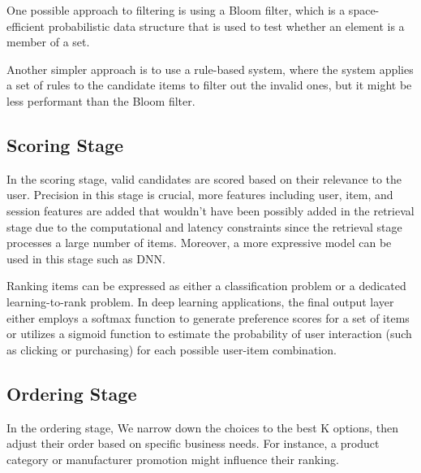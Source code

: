 One possible approach to filtering is using a Bloom filter, which is a space-efficient probabilistic data structure that is used to test whether an element is a member of a set.

Another simpler approach is to use a rule-based system, where the system applies a set of rules to the candidate items to filter out the invalid ones, but it might be less performant than the Bloom filter.


\subsection{Scoring Stage}

In the scoring stage, valid candidates are scored based on their relevance to the user. Precision in this stage is crucial, more features including user, item, and session features are added that wouldn't have been possibly added in the retrieval stage due to the computational and latency constraints since the retrieval stage processes a large number of items. Moreover, a more expressive model can be used in this stage such as DNN. \cite{eugeneyan}

Ranking items can be expressed as either a classification problem or a dedicated learning-to-rank problem. In deep learning applications, the final output layer either employs a softmax function to generate preference scores for a set of items or utilizes a sigmoid function to estimate the probability of user interaction (such as clicking or purchasing) for each possible user-item combination. \cite{eugeneyan}

\subsection{Ordering Stage}
In the ordering stage, We narrow down the choices to the best K options, then adjust their order based on specific business needs. For instance, a product category or manufacturer promotion might influence their ranking. \cite{NvidiaRecSysBestPractices}
